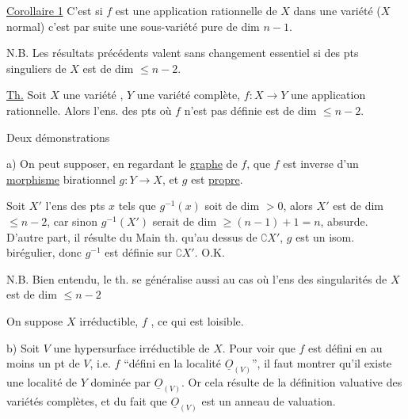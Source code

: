 

\uline{Corollaire 1}   C'est  si $f$ est une application rationnelle de $X$ dans une variété  ($X$ normal) c'est par suite une sous-variété pure de dim $n-1$.

 N.B. Les résultats précédents valent sans changement essentiel si   des pts singuliers de $X$ est de dim $\leq n-2$.

\uline{Th.} Soit $X$ une variété , $Y$  une variété complète, $f:X\longrightarrow Y$ une application rationnelle. Alors l'ens. des pts où $f$ n'est pas définie est de dim $\leq n-2$.

 Deux démonstrations

a) On peut supposer, en regardant le \uline{graphe} de $f$, que $f$ est inverse d'un \uline{morphisme} birationnel $g:Y\longrightarrow X$, et $g$ est  \uline{propre}.

 Soit $X'$ l'ens des pts $x$  tels que $g^{-1}(x)$ soit de dim $>0$, alors $X'$ est de dim $\leq n-2$, car sinon $g^{-1}(X')$ serait de dim $\geq(n-1)+1=n$, absurde.  D'autre part, il résulte du Main th. qu'au dessus de $\complement X'$, $g$ est un isom. birégulier, donc $g^{-1}$ est définie sur $\complement X'$. O.K.

N.B. Bien entendu, le th. se généralise aussi au cas où  l'ens des singularités de $X$ est de dim $\leq n-2$



On suppose $X$ irréductible, $f$ , ce qui est loisible.

b) Soit $V$ une hypersurface irréductible de $X$. Pour voir que $f$ est défini en au moins un pt de $V$,  i.e. $f$ ``défini en la localité $\underline O_{(V)}$'', il faut montrer qu'il existe une localité de $Y$ dominée par $\underline O_{(V)}$. Or cela résulte de la définition valuative des variétés complètes, et du fait que $\underline O_{(V)}$ est un anneau de valuation.

